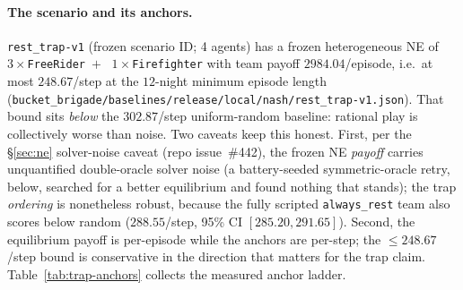 \documentclass{anvil-paper}
\begin{document}
\paragraph{The scenario and its anchors.}
\texttt{rest\_trap-v1} (frozen scenario ID; 4 agents) has a frozen
heterogeneous NE of $3{\times}$\texttt{FreeRider}~$+$~%
$1{\times}$\texttt{Firefighter} with team payoff $2984.04$/episode,
i.e.\ at most $248.67$/step at the $12$-night minimum episode length
(\texttt{bucket\_brigade/baselines/release/local/nash/rest\_trap-v1.json}).
That bound sits \emph{below} the $302.87$/step uniform-random baseline:
rational play is collectively worse than noise. Two caveats keep this
honest. First, per the \S\ref{sec:ne} solver-noise caveat (repo
issue~\#442), the frozen NE \emph{payoff} carries unquantified
double-oracle solver noise (a battery-seeded symmetric-oracle retry,
below, searched for a better equilibrium and found nothing that
stands); the trap \emph{ordering} is nonetheless robust, because the
fully scripted \texttt{always\_rest} team also scores below random
($288.55$/step, 95\% CI $[285.20, 291.65]$). Second, the equilibrium
payoff is per-episode while the anchors are per-step; the
$\leq 248.67$/step bound is conservative in the direction that matters
for the trap claim. Table~\ref{tab:trap-anchors} collects the measured
anchor ladder.
\end{document}
